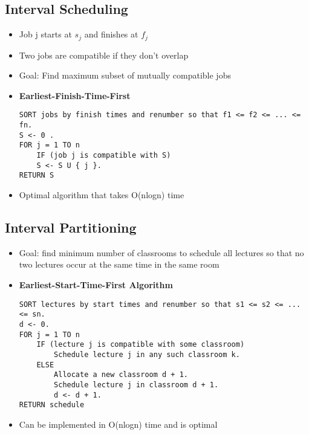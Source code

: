 \documentclass[notitlepage]{article}
\begin{document}
    \subsection{Interval Scheduling}
    \begin{itemize}
        \item Job j starts at $s_j$ and finishes at $f_j$
        \item Two jobs are compatible if they don't overlap
        \item Goal: Find maximum subset of mutually compatible jobs
        \item \textbf{Earliest-Finish-Time-First}
\begin{verbatim}
SORT jobs by finish times and renumber so that f1 <= f2 <= ... <= fn.
S <- 0 .
FOR j = 1 TO n
    IF (job j is compatible with S)
    S <- S U { j }.
RETURN S
\end{verbatim}
    \item Optimal algorithm that takes O(nlogn) time
    \end{itemize} 

    \subsection{Interval Partitioning}
    \begin{itemize}
        \item Goal: find minimum number of classrooms to schedule all lectures so that no 
            two lectures occur at the same time in the same room
        \item \textbf{Earliest-Start-Time-First Algorithm}
\begin{verbatim}
SORT lectures by start times and renumber so that s1 <= s2 <= ... <= sn.
d <- 0.
FOR j = 1 TO n
    IF (lecture j is compatible with some classroom)
        Schedule lecture j in any such classroom k.
    ELSE
        Allocate a new classroom d + 1.
        Schedule lecture j in classroom d + 1.
        d <- d + 1.
RETURN schedule
\end{verbatim}
    \item Can be implemented  in O(nlogn) time and is optimal
    \end{itemize}
    
\end{document}
